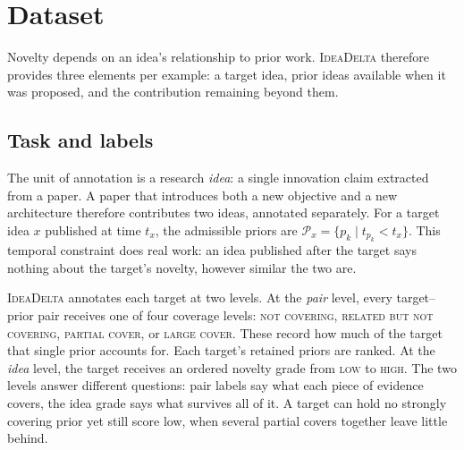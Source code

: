 %

\section{Dataset}
\label{sec:dataset}

Novelty depends on an idea's relationship to prior work. \textsc{IdeaDelta}
therefore provides three elements per example: a target idea, prior ideas
available when it was proposed, and the contribution remaining beyond them.

\subsection{Task and labels}
\label{sec:dataset-task}

The unit of annotation is a research \emph{idea}: a single innovation claim
extracted from a paper. A paper that introduces both a new objective and a new
architecture therefore contributes two ideas, annotated separately. For a
target idea $x$ published at time $t_x$, the admissible priors are
$\mathcal{P}_x=\{p_k\mid t_{p_k}<t_x\}$. This temporal constraint does real
work: an idea published after the target says nothing about the target's
novelty, however similar the two are.

\textsc{IdeaDelta} annotates each target at two levels. At the \emph{pair}
level, every target--prior pair receives one of four coverage levels:
\textsc{not covering}, \textsc{related but not covering}, \textsc{partial
cover}, or \textsc{large cover}. These record how much of the target that
single prior accounts for. Each target's retained priors are ranked.
At the \emph{idea} level, the target receives an ordered novelty grade from
\textsc{low} to \textsc{high}. The two levels answer different questions: pair
labels say what each piece of evidence covers, the idea grade says what
survives all of it. A target can hold no strongly covering prior yet still
score low, when several partial covers together leave little behind.

